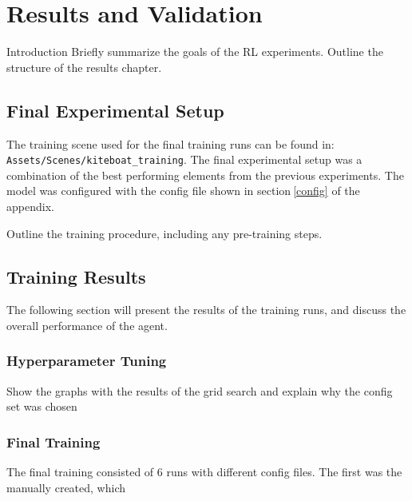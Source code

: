 

\let\textcircled=\pgftextcircled\chapter{Results and Validation}\label{chap:results}

Introduction
Briefly summarize the goals of the RL experiments.
Outline the structure of the results chapter.

\section{Final Experimental Setup}
The training scene used for the final training runs can be found in:
\newline
\texttt{Assets/Scenes/kiteboat\_training}. The final experimental setup was a combination of the best performing elements from the previous experiments. The model was configured with the config file shown in section$~$\ref{config} of the appendix. 


Outline the training procedure, including any pre-training steps.

\section{Training Results}

The following section will present the results of the training runs, and discuss the overall performance of the agent. 

\subsection{Hyperparameter Tuning}\label{sec:hyperparameter_tuning}

Show the graphs with the results of the grid search and explain why the config set was chosen



\subsection{Final Training}

The final training consisted of 6 runs with different config files. The first was the manually created, which 

